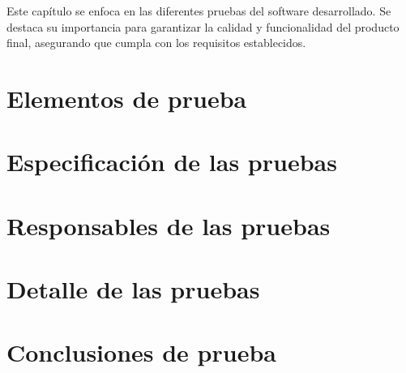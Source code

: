 Este capítulo se enfoca en las diferentes pruebas del software desarrollado. Se destaca su importancia para garantizar la calidad y funcionalidad del producto final, asegurando que cumpla con los requisitos establecidos.
\section{Elementos de prueba}
\section{Especificación de las pruebas}
\section{Responsables de las pruebas}
\section{Detalle de las pruebas}
\section{Conclusiones de prueba}
